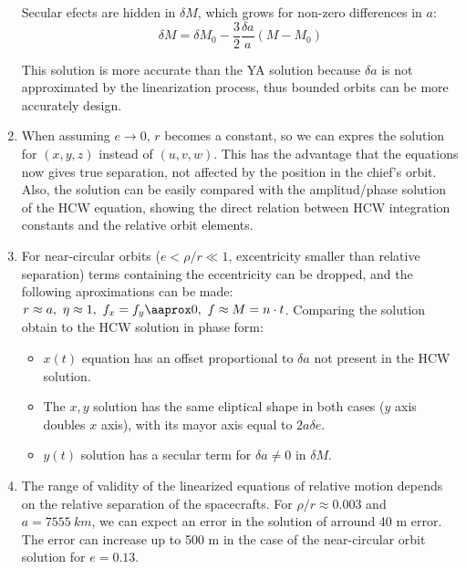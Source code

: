 \documentclass[a4paper]{article}
\begin{document}
\begin{enumerate}[label=\emph{\alph*)}]
    Secular efects are hidden in $\delta M$, which grows for non-zero differences in $a$:
    \[\delta M = \delta M_0 - \frac{3}{2}\frac{\delta a}{a}(M-M_0)\]

    This solution is more accurate than the YA solution because $\delta a$ is not approximated by the linearization process, thus bounded orbits can be more accurately design.

  \item %
    When assuming $e\rightarrow 0$, $r$ becomes a constant, so we can expres the solution for $(x,y,z)$ instead of $(u,v,w)$. This has the advantage that the equations now gives true separation, not affected by the position in the chief's orbit. Also, the solution can be easily compared with the amplitud/phase solution of the HCW equation, showing the direct relation between HCW integration constants and the relative orbit elements.

  \item %
    For near-circular orbits ($e<\rho/r\ll1$, excentricity smaller than relative separation) terms containing the eccentricity can be dropped, and the following aproximations can be made: $r\approx a, ~\eta\approx 1,~f_x = f_y \aaprox 0,~f\approx M=n\cdot t$. Comparing the solution obtain to the HCW solution in phase form:
    \begin{itemize}
      \item $x(t)$ equation has an offset proportional to $\delta a$ not present in the HCW solution.
      \item The $x,y$ solution has the same eliptical shape in both cases ($y$ axis doubles $x$ axis), with its mayor axis equal to $2a\delta e$.
      \item $y(t)$ solution has a secular term for $\delta a \neq 0$ in $\delta M$.
    \end{itemize}

  \item %
    The range of validity of the linearized equations of relative motion depends on the relative separation of the spacecrafts. For $\rho/r\approx 0.003$ and $a=7555~km$, we can expect an error in the solution of arround 40 m error. The error can increase up to 500 m in the case of the near-circular orbit solution for $e=0.13$.


\end{enumerate}
\end{document}
